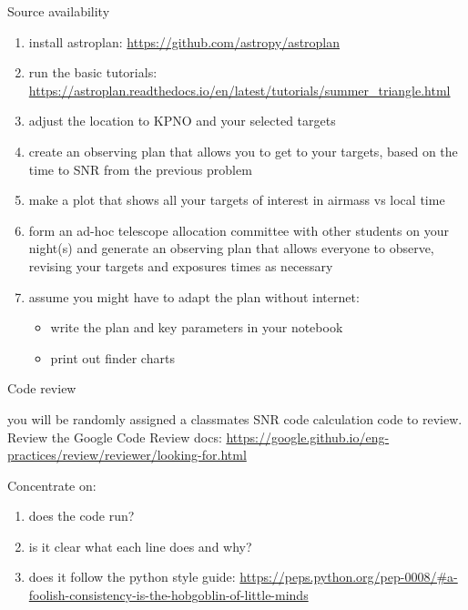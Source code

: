 \begin{frame}{Source availability}

 \begin{enumerate}
 \item install astroplan: \url{https://github.com/astropy/astroplan}
 \item run the basic tutorials: \url{https://astroplan.readthedocs.io/en/latest/tutorials/summer_triangle.html}
 \item adjust the location to KPNO and your selected targets
 \item create an observing plan that allows you to get to your targets, based on the time to SNR from the previous problem
 \item make a plot that shows all your targets of interest in airmass vs local time
 \item form an ad-hoc telescope allocation committee with other students on your night(s) and generate an observing plan that allows everyone to observe, revising your targets and exposures times as necessary 
 \item  assume you might have to adapt the plan without internet:
 \begin{itemize}
    \item write the plan and key parameters in your notebook
     \item print out finder charts
 \end{itemize}
\end{enumerate}
\end{frame}

\begin{frame}{Code review}

you will be randomly assigned a classmates SNR code calculation code to review. 
Review the Google Code Review docs: \url{https://google.github.io/eng-practices/review/reviewer/looking-for.html}

Concentrate on:
 \begin{enumerate}
 \item does the code run?
 \item is it clear what each line does and why?
 \item does it follow the python style guide: \tiny{\url{https://peps.python.org/pep-0008/\#a-foolish-consistency-is-the-hobgoblin-of-little-minds}}
\end{enumerate}

\end{frame}


